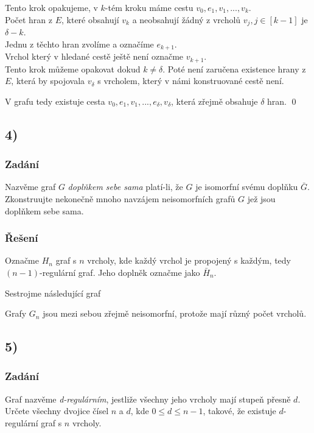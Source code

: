 \documentclass[../main.tex]{subfiles}
\begin{document}
Tento krok opakujeme, v $k$-tém kroku máme cestu $v_0, e_1, v_1, ..., v_k$. \\
Počet hran z $E$, které obsahují $v_k$ a neobsahují žádný z vrcholů $v_j, j\in[k-1]$ je $\delta-k$.\\
Jednu z těchto hran zvolíme a označíme $e_{k+1}$.\\
Vrchol který v hledané cestě ještě není označme $v_{k+1}$.\\


Tento krok můžeme opakovat dokud $k \neq \delta$. Poté není zaručena existence hrany z $E$, 
která by spojovala $v_\delta$ s vrcholem, který v námi konstruované cestě není.

V grafu tedy existuje cesta $v_0, e_1, v_1, ...,e_\delta , v_\delta$, která zřejmě obsahuje $\delta$ hran.
\qed


\subsection*{4)}
\subsubsection*{Zadání}
Nazvěme graf $G$ \textit{doplňkem sebe sama} platí-li, že $G$ je isomorfní svému doplňku $\bar{G}$. 
Zkonstruujte nekonečně mnoho navzájem neisomorfních grafů $G$ jež jsou doplňkem sebe sama.
\subsubsection*{Řešení}

Označme $H_n$ graf s $n$ vrcholy, kde každý vrchol je propojený s každým, tedy $(n-1)$-regulární graf. 
Jeho doplněk označme jako $\bar{H}_n$.

Sestrojme následující graf





Grafy $G_n$ jsou mezi sebou zřejmě neisomorfní, protože mají různý počet vrcholů.



\subsection*{5)}
\subsubsection*{Zadání}
Graf nazvěme \textit{d-regulárním}, jestliže všechny jeho vrcholy mají stupeň přesně $d$. 
Určete všechny dvojice čísel $n$ a $d$, kde $0\leq d\leq n-1$, takové, že existuje $d$-regulární graf s $n$ vrcholy.
\end{document}
